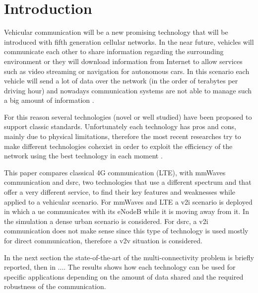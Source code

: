 
\section{Introduction}
\label{sec:introduction}

Vehicular communication will be a new promising technology that will be introduced with fifth generation cellular networks. In the near future, vehicles will communicate each other to share information regarding the surrounding environment or they will download information from Internet to allow services such as video streaming or navigation for autonomous cars.
In this scenario each vehicle will send a lot of data over the network (in the order of terabytes per driving hour) and nowadays communication systems are not able to manage such a big amount of information \cite{Va2016}.

For this reason several technologies (novel or well studied) have been proposed to support classic standards. Unfortunately each technology has pros and cons, mainly due to physical limitations, therefore the most recent researches try to make different technologies cohexist in order to exploit the efficiency of the network using the best technology in each moment \cite{Giordani16}.

This paper compares classical 4G communication (LTE), with \gls{mmWaves} communication and \gls{dsrc}, two technologies that use a different spectrum and that offer a very different service, to find their key features and weaknesses while applied to a vehicular scenario.
For \gls{mmWaves} and LTE a \gls{v2i} scenario is deployed in which a \gls{ue} communicates with its eNodeB while it is moving away from it. In the simulation a dense urban scenario is considered.
For \gls{dsrc}, a \gls{v2i} communication does not make sense since this type of technology is used mostly for direct communication, therefore a \gls{v2v} situation is considered.

In the next section the state-of-the-art of the multi-connectivity problem is briefly reported, then in ....
The results shows how each technology can be used for specific applications depending on the amount of data shared and the required robustness of the communication.
